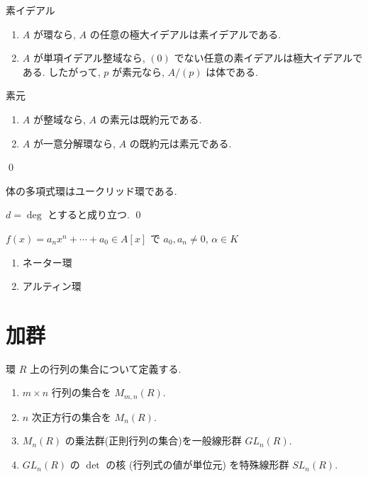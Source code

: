 \documentclass[uplatex,dvipdfmx,a4paper,11pt]{jlreq}
\makeatletter
\theoremstyle{definition}
\renewenvironment{proof}[1][\proofname]{\par
  \normalfont
  \topsep6\p@\@plus6\p@ \trivlist
  \item[\hskip\labelsep{\bfseries #1}\@addpunct{\bfseries}]\ignorespaces\quad\par
}{%
  \qed\endtrivlist\@endpefalse
}
\renewcommand\proofname{証明}
\makeatother
\begin{document}
\begin{proposition}[素イデアルと極大イデアルの関係]
  素イデアル
  \begin{enumerate}
    \item $A$ が環なら, $A$ の任意の極大イデアルは素イデアルである.
    \item $A$ が単項イデアル整域なら, $(0)$ でない任意の素イデアルは極大イデアルである. したがって, $p$ が素元なら, $A/(p)$ は体である.
  \end{enumerate}
\end{proposition}
\begin{proposition}[素元と既約元の関係]
  素元
  \begin{enumerate}
    \item $A$ が整域なら, $A$ の素元は既約元である.
    \item $A$ が一意分解環なら, $A$ の既約元は素元である.
  \end{enumerate}
\end{proposition}
\begin{proof}

\end{proof}

\begin{proposition}
  体の多項式環はユークリッド環である.
\end{proposition}
\begin{proof}
  $d = \deg$ とすると成り立つ.
\end{proof}

\begin{proposition}[正規環]
  $f(x) = a_nx^n + \cdots + a_0\in A[x]$ で $a_0, a_n \neq 0$, $\alpha\in K$
\end{proposition}

\begin{definition}
  \begin{enumerate}
    \item ネーター環
    \item アルティン環
  \end{enumerate}
\end{definition}

\section{加群}
\begin{definition}
  環 $R$ 上の行列の集合について定義する.
  \begin{enumerate}
    \item $m\times n$ 行列の集合を $M_{m,n}(R)$.
    \item $n$ 次正方行の集合を $M_n(R)$.
    \item $M_n(R)$ の乗法群(正則行列の集合)を一般線形群 $GL_n(R)$.
    \item $GL_n(R)$ の $\det$ の核 (行列式の値が単位元) を特殊線形群 $SL_n(R)$.
  \end{enumerate}
\end{definition}
\end{document}
